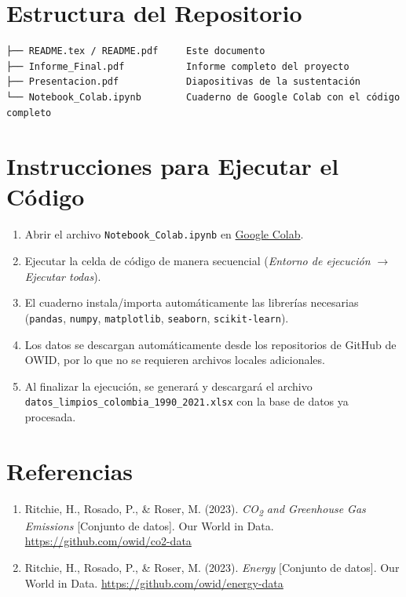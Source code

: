 \documentclass[11pt]{article}
\begin{document}
\section{Estructura del Repositorio}

\begin{verbatim}
├── README.tex / README.pdf     Este documento
├── Informe_Final.pdf           Informe completo del proyecto
├── Presentacion.pdf            Diapositivas de la sustentación
└── Notebook_Colab.ipynb        Cuaderno de Google Colab con el código completo
\end{verbatim}

\section{Instrucciones para Ejecutar el Código}

\begin{enumerate}[leftmargin=1.2cm]
    \item Abrir el archivo \texttt{Notebook\_Colab.ipynb} en \href{https://colab.research.google.com/}{Google Colab}.
    \item Ejecutar la celda de código de manera secuencial (\textit{Entorno de ejecución} $\rightarrow$ \textit{Ejecutar todas}).
    \item El cuaderno instala/importa automáticamente las librerías necesarias (\texttt{pandas}, \texttt{numpy}, \texttt{matplotlib}, \texttt{seaborn}, \texttt{scikit-learn}).
    \item Los datos se descargan automáticamente desde los repositorios de GitHub de OWID, por lo que no se requieren archivos locales adicionales.
    \item Al finalizar la ejecución, se generará y descargará el archivo \texttt{datos\_limpios\_colombia\_1990\_2021.xlsx} con la base de datos ya procesada.
\end{enumerate}

\section{Referencias}

\begin{enumerate}[leftmargin=1.2cm]
    \item[] Ritchie, H., Rosado, P., \& Roser, M. (2023). \textit{CO\textsubscript{2} and Greenhouse Gas Emissions} [Conjunto de datos]. Our World in Data. \url{https://github.com/owid/co2-data}
    \item[] Ritchie, H., Rosado, P., \& Roser, M. (2023). \textit{Energy} [Conjunto de datos]. Our World in Data. \url{https://github.com/owid/energy-data}
\end{enumerate}
\end{document}
